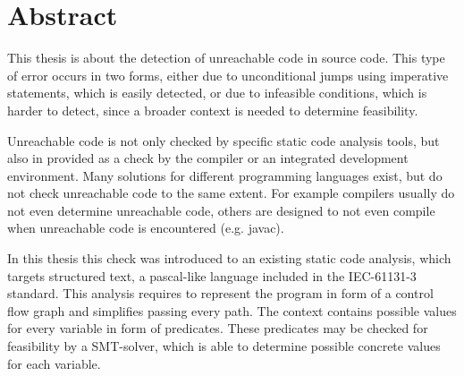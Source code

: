 \chapter{Abstract}
\label{cha:abstract}

This thesis is about the detection of unreachable code in source code. This type of error occurs in two forms, either due to unconditional jumps using imperative statements, which is easily detected, or due to infeasible conditions, which is harder to detect, since a broader context is needed to determine feasibility.


Unreachable code is not only checked by specific static code analysis tools, but also in provided as a check by the compiler or an integrated development environment. Many solutions for different programming languages exist, but do not check unreachable code to the same extent. For example compilers usually do not even determine unreachable code, others are designed to not even compile when unreachable code is encountered (e.g. javac).


In this thesis this check was introduced to an existing static code analysis, which targets structured text, a pascal-like language included in the IEC-61131-3 standard. This analysis requires to represent the program in form of a control flow graph and simplifies passing every path. The context contains possible values for every variable in form of predicates. These predicates may be checked for feasibility by a SMT-solver, which is able to determine possible concrete values for each variable. 